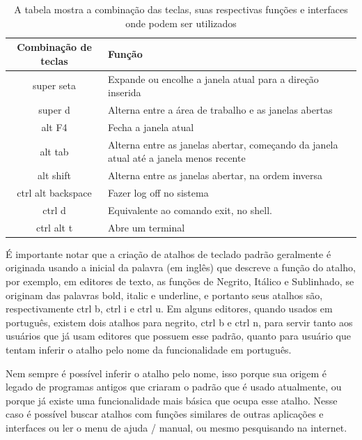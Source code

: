 \documentclass[oneside, 11 pt]{article}
\begin{document}
	\pagebreak
	
	\begin{table}
		\centering
		\begin{tabular}{|c|p{10.0cm}|}
			\hline
			\bfseries Combinação de teclas & \bfseries Função \\ \hline
			super seta & Expande ou encolhe a janela atual para a direção inserida \\ \hline
			super d & Alterna entre a área de trabalho e as janelas abertas \\ \hline
			alt F4 & Fecha a janela atual \\ \hline
			alt tab & Alterna entre as janelas abertar, começando da janela atual até a janela menos recente\\ \hline
			alt shift & Alterna entre as janelas abertar, na ordem inversa\\ \hline
			ctrl alt backspace & Fazer log off no sistema \\ \hline
			ctrl d & Equivalente ao comando exit, no shell. \\ \hline
			ctrl alt t & Abre um terminal \\ \hline
		\end{tabular}
		\caption{A tabela mostra a combinação das teclas, suas respectivas funções e interfaces onde podem ser utilizados}
		\label{table:1}
	\end{table}

	É importante notar que a criação de atalhos de teclado padrão geralmente é originada usando a inicial da palavra (em inglês) que descreve a função do atalho, por exemplo, em editores de texto, as funções de Negrito, Itálico e Sublinhado, se originam das palavras bold, italic e underline, e portanto seus atalhos são, respectivamente ctrl b, ctrl i e ctrl u. Em alguns editores, quando usados em português, existem dois atalhos para negrito, ctrl b e ctrl n, para servir tanto aos usuários que já usam editores que possuem esse padrão, quanto para usuário que tentam inferir o atalho pelo nome da funcionalidade em português.
	
	Nem sempre é possível inferir o atalho pelo nome, isso porque sua origem é legado de programas antigos que criaram o padrão que é usado atualmente, ou porque já existe uma funcionalidade mais básica que ocupa esse atalho. Nesse caso é possível buscar atalhos com funções similares de outras aplicações e interfaces ou ler o menu de ajuda / manual, ou mesmo pesquisando na internet.
	
\end{document}
